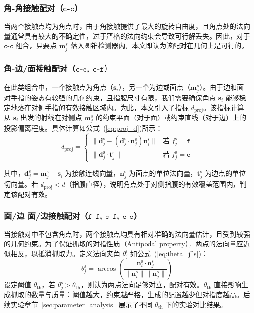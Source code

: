 \subsubsection{角-角接触配对（$\mathtt{c}$-$\mathtt{c}$）}
当两个接触点均为角点时，由于角接触提供了最大的旋转自由度，且角点处的法向量通常具有较大的不确定性，过于严格的法向约束会导致可行解丢失。因此，对于 $\mathtt{c}$-$\mathtt{c}$ 组合，只要点 $\mathbf{m}_j^s$ 落入圆锥检测器内，本文即认为该配对在几何上是可行的。

\subsubsection{角-边/面接触配对（$\mathtt{c}$-$\mathtt{e}$, $\mathtt{c}$-$\mathtt{f}$）}
在此类组合中，一个接触点为角点（$\mathbf{s}_i$），另一个为边或面点（$\mathbf{m}_j^s$）。由于边和面对手指的姿态有较强的几何约束，且指腹尺寸有限，我们需要确保角点 $\mathbf{s}_i$ 能够稳定地落在对侧手指的有效接触区域内。为此，本文引入了指标 $d_{\text{proj}}$。该指标计算从 $\mathbf{s}_i$ 出发的射线在对侧点 $\mathbf{m}_j^s$ 的约束平面（对于面）或约束直线（对于边）上的投影偏离程度。具体计算如公式~(\ref{eq:proj_d})所示：
\begin{equation}
    d_{\text{proj}} = \begin{cases}
    \|\mathbf{d}_j^\text{s} - (\mathbf{d}_j^\text{s} \cdot \mathbf{n}_j^\text{s})\mathbf{n}_j^\text{s}\| & \text{若 } f_j^\text{s} = \mathtt{f} \\
    \|\mathbf{d}_j^\text{s} \cdot \mathbf{t}_j^\text{s}\| & \text{若 } f_j^\text{s} = \mathtt{e}
    \end{cases}
    \label{eq:proj_d}
\end{equation}

其中，$\mathbf{d}_j^\text{s} = \mathbf{m}_j^\text{s} - \mathbf{s}_i$ 为接触连线向量，$\mathbf{n}_j^\text{s}$ 为面点的单位法向量，$\mathbf{t}_j^\text{s}$ 为边点的单位切向量。若 $d_{\text{proj}} < d$（指腹直径），说明角点处于对侧指腹的有效覆盖范围内，判定该配对有效。

\subsubsection{面/边-面/边接触配对（$\mathtt{f}$-$\mathtt{f}$, $\mathtt{e}$-$\mathtt{f}$, $\mathtt{e}$-$\mathtt{e}$）}
当接触对中不包含角点时，两个接触点均具有相对准确的法向量估计，且受到较强的几何约束。为了保证抓取的对指性质（Antipodal property），两点的法向量应近似相反，以抵消抓取力。定义法向夹角 $\theta_j^\text{s}$ 如公式~(\ref{eq:theta_j^s})：
\begin{equation}
    \theta_j^\text{s} = \arccos \left( \frac{\mathbf{n}_i^\text{s} \cdot \mathbf{n}_j^\text{s}}{\|\mathbf{n}_i^\text{s}\| \|\mathbf{n}_j^\text{s}\|} \right)
    \label{eq:theta_j^s}
\end{equation}
设定阈值 $\theta_{\text{th}}$，若 $\theta_j^\text{s} > \theta_{\text{th}}$，则认为两点法向足够对立，配对有效。$\theta_{\text{th}}$ 直接影响生成抓取的数量与质量：阈值越大，约束越严格，生成的配置越少但对指度越高。后续实验章节~\ref{sec:parameter_analysis}~展示了不同 $\theta_{\text{th}}$ 下的实验对比结果。

